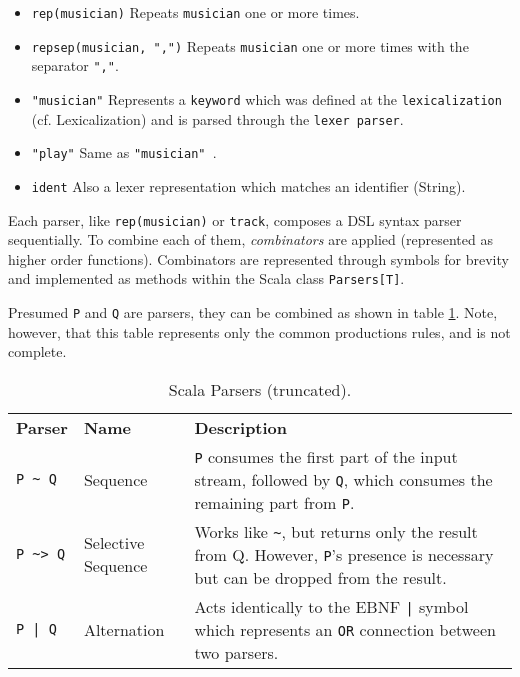 \begin{itemize}
\item\texttt{rep(musician)} \newline Repeats  \texttt{musician}   one or more times.
\item\texttt{repsep(musician, ",")} \newline Repeats  \texttt{musician}   one or more times with the separator  \texttt{","}.
\item\texttt{"musician"} \newline Represents a  \texttt{keyword}   which was defined at the  \texttt{lexicalization}   (cf. Lexicalization) and is parsed through the  \texttt{lexer parser}.
\item\texttt{"play"} \newline Same as  \texttt{"musician" }.
\item\texttt{ident} \newline Also a lexer representation which matches an identifier (String).
\end{itemize}

Each parser, like \texttt{rep(musician)} or \texttt{track}, composes a DSL syntax parser sequentially. To combine each of them, \textit{combinators} are applied (represented as higher order functions). Combinators are represented through symbols for brevity and implemented as methods within the Scala class \texttt{Parsers[T]}.\cite{Ghosh2010}

Presumed \texttt{P} and \texttt{Q} are parsers, they can be combined as shown in table \ref{TBL_COMBINATORS}. Note, however, that this table represents only the common productions rules, and is not complete.

\begin{table}[h]
\caption{Scala Parsers (truncated).\cite{Riti2018}}
\label{TBL_COMBINATORS}
\begin{tabular}{l|l|p{180pt}}
\rowcolor{htwg-teal} 
\textbf{Parser}      & \textbf{Name}		& \textbf{Description}     \\
\lstinline|P ~ Q|						& Sequence 					& \texttt{P} consumes the first part of the input stream, followed by \texttt{Q}, which consumes the remaining part from \texttt{P}. \\
\lstinline|P ~> Q|		 					& Selective Sequence	& Works like \lstinline|~|, but returns only the result from \texttt{} Q. However, \texttt{P}'s presence is necessary but can be dropped from the result. \\
\texttt{P | Q}								& Alternation					& Acts identically to the EBNF \texttt{|} symbol which represents an \texttt{OR} connection between two parsers.
\end{tabular}
\end{table}

